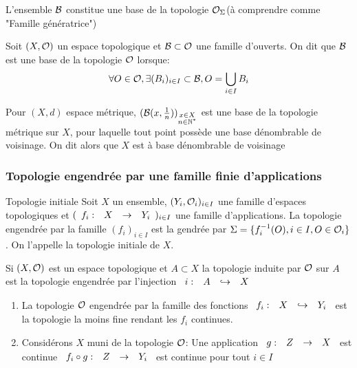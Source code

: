 \documentclass[]{report}
\begin{document}
    \begin{re}{}{}
        L'ensemble $\mathcal{B}$ constitue une base de la topologie $\mathcal{O}_\Sigma$(à comprendre comme "Famille génératrice")
    \end{re}

    \begin{df}{}{}
        Soit $(X,\mathcal{O})$ un espace topologique et $\mathcal{B}\subset \mathcal{O}$ une famille d'ouverts. On dit que $\mathcal{B}$ est une base de la topologie $\mathcal{O}$ lorsque:
        \[\forall O\in \mathcal{O},\exists (B_i)_{i\in I}\subset \mathcal{B},O=\bigcup_{i\in I}B_i\]
    \end{df}

    \begin{ex}{}{}
        Pour $(X,d)$ espace métrique, $(\mathcal{B}(x,\frac{1}{n}))_{\substack{x\in X\\ n\in\mathbb{N}^*}}$ est une base de la topologie métrique sur $X$, pour laquelle tout point possède une base dénombrable de voisinage. On dit alors que $X$ est à base dénombrable de voisinage
    \end{ex}

    \subsubsection*{Topologie engendrée par une famille finie d'applications}

    \begin{df}{Topologie initiale}{}
        Soit $X$ un ensemble, $(Y_i,\mathcal{O}_i)_{i\in I}$ une famille d'espaces topologiques et $(\begin{array}{ccccc} f_i : & X & \to & Y_i \end{array})_{i\in I}$ une famille d'applications. La topologie engendrée par la famille $(f_i)_{i\in I}$ est la gendrée par $\Sigma=\{f_i^{-1}(O),i\in I,O\in \mathcal{O}_i\}$. On l'appelle la topologie initiale de $X$.
    \end{df}

    \begin{ex}{}{}
        Si $(X,\mathcal{O})$ est un espace topologique et $A\subset X$ la topologie induite par $\mathcal{O}$ sur $A$ est la topologie engendrée par l'injection $\begin{array}{ccccc} i : & A & \hookrightarrow & X \end{array}$
    \end{ex}

    \begin{prop}{}{}
        \begin{enumerate}
            \item La topologie $\mathcal{O}$ engendrée par la famille des fonctions $\begin{array}{ccccc} f_i : & X & \hookrightarrow & Y_i \end{array}$ est la topologie la moins fine rendant les $f_i$ continues.
            \item Considérons $X$ muni de la topologie $\mathcal{O}$: Une application $\begin{array}{ccccc} g : & Z & \to & X \end{array}$ est continue \ssi $\begin{array}{ccccc} f_i\circ g : & Z & \to & Y_i \end{array}$ est continue pour tout $i\in I$
        \end{enumerate}
    \end{prop}
\end{document}
